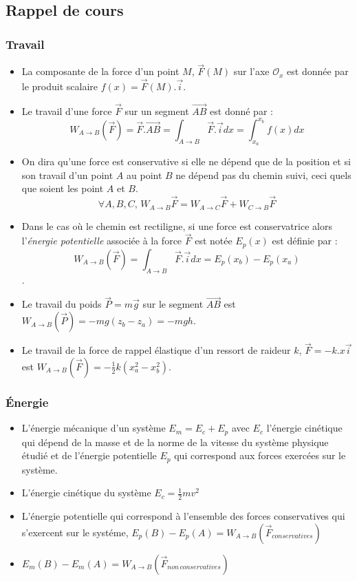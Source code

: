 \documentclass[]{book}
\theoremstyle{definition}
\begin{document}
\subsection*{Rappel de cours}
\subsubsection*{Travail}

\begin{itemize}
\item La composante de la force d'un point $M$, $\overrightarrow{F}(M)$ sur l'axe $\mathcal{O}_x$ est donn\'ee par le produit scalaire $f(x) = \overrightarrow{F}(M).\overrightarrow{i}$. 
\item Le travail d'une force $\overrightarrow{F}$ sur un segment $\overrightarrow{AB}$ est donn\'e par :
$$W_{A \to B}(\overrightarrow{F}) = \overrightarrow{F}.\overrightarrow{AB} = \int_{A \to B} \overrightarrow{F}.\overrightarrow{i}dx = \int_{x_a}^{x_b} f(x)dx$$ 
\item On dira qu'une force est conservative si elle ne d\'epend que de la position et si son travail d'un point $A$ au point $B$ ne d\'epend pas du chemin suivi, ceci quels que soient les point $A$ et $B$.
$$\forall A,B,C,\, W_{A \to B} \overrightarrow{F} = W_{A \to C} \overrightarrow{F} + W_{C \to B} \overrightarrow{F}$$
\item Dans le cas o\`u le chemin est rectiligne, si une force est conservatrice alors l'\emph{\'energie potentielle} associ\'ee \`a la force $\overrightarrow{F}$ est not\'ee $E_p(x)$ est d\'efinie par :
$$W_{A \to B}(\overrightarrow{F}) = \int_{A \to B} \overrightarrow{F}.\overrightarrow{i}dx = E_p(x_b) - E_p(x_a)$$. 
\item Le travail du poids $\overrightarrow{P} = m\overrightarrow{g}$ sur le segment $\overrightarrow{AB}$ est $W_{A \to B}(\overrightarrow{P}) = -mg(z_b - z_a) = -mgh$.
\item Le travail de la force de rappel \'elastique d'un ressort de raideur $k$, $\overrightarrow{F} = -k.x\overrightarrow{i}$ est $W_{A \to B}(\overrightarrow{F}) = -\frac{1}{2}k(x_a^2 - x_b^2)$.
\end{itemize}


\subsubsection*{\'Energie}
\begin{itemize}
\item L'\'energie m\'ecanique d'un syst\`eme $E_m = E_c + E_p$ avec $E_c$ l'\'energie cin\'etique qui d\'epend de la masse et de la norme de la vitesse du syst\`eme physique \'etudi\'e et de l'\'energie potentielle $E_p$ qui correspond aux forces exerc\'ees sur le syst\`eme.
\item L'\'energie cin\'etique du syst\`eme $E_c = \frac{1}{2}mv^2$
\item L'\'energie potentielle qui correspond \`a l'ensemble des forces conservatives qui s'exercent sur le syst\'eme, $E_p(B) - E_p(A) = W_{A \to B}(\overrightarrow{F}_{conservatives})$
\item $E_m(B) - E_m(A) = W_{A \to B}(\overrightarrow{F}_{non\, conservatives})$
\end{itemize}
\end{document}
